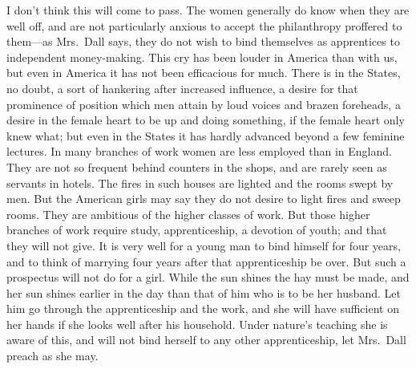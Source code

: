 I don't think this will come to pass.  The women generally do know
when they are well off, and are not particularly anxious to accept
the philanthropy proffered to them---as Mrs.\ Dall says, they do not
wish to bind themselves as apprentices to independent money-making.
This cry has been louder in America than with us, but even in
America it has not been efficacious for much.  There is in the
States, no doubt, a sort of hankering after increased influence, a
desire for that prominence of position which men attain by loud
voices and brazen foreheads, a desire in the female heart to be up
and doing something, if the female heart only knew what; but even
in the States it has hardly advanced beyond a few feminine
lectures.  In many branches of work women are less employed than in
England.  They are not so frequent behind counters in the shops,
and are rarely seen as servants in hotels.  The fires in such
houses are lighted and the rooms swept by men.  But the American
girls may say they do not desire to light fires and sweep rooms.
They are ambitious of the higher classes of work.  But those higher
branches of work require study, apprenticeship, a devotion of
youth; and that they will not give.  It is very well for a young
man to bind himself for four years, and to think of marrying four
years after that apprenticeship be over.  But such a prospectus
will not do for a girl.  While the sun shines the hay must be made,
and her sun shines earlier in the day than that of him who is to be
her husband.  Let him go through the apprenticeship and the work,
and she will have sufficient on her hands if she looks well after
his household.  Under nature's teaching she is aware of this, and
will not bind herself to any other apprenticeship, let Mrs.\ Dall
preach as she may.

